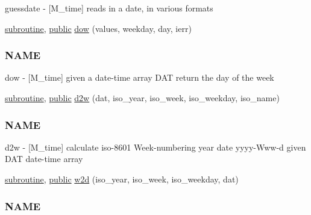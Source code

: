 \begin{DoxyCompactItemize}
\begin{DoxyCompactList}
guessdate -\/ \mbox{[}M\+\_\+time\mbox{]} reads in a date, in various formats \end{DoxyCompactList}\item 
\hyperlink{M__stopwatch_83_8txt_acfbcff50169d691ff02d4a123ed70482}{subroutine}, \hyperlink{M__stopwatch_83_8txt_a2f74811300c361e53b430611a7d1769f}{public} \hyperlink{namespacem__time_adfda8a89820b8d0ad4581a14896e4ce5}{dow} (values, weekday, day, ierr)
\begin{DoxyCompactList}\small\item\em \subsubsection*{N\+A\+ME}

dow -\/ \mbox{[}M\+\_\+time\mbox{]} given a date-\/time array D\+AT return the day of the week \end{DoxyCompactList}\item 
\hyperlink{M__stopwatch_83_8txt_acfbcff50169d691ff02d4a123ed70482}{subroutine}, \hyperlink{M__stopwatch_83_8txt_a2f74811300c361e53b430611a7d1769f}{public} \hyperlink{namespacem__time_ad4ff99ad6f6d5282c4b65ad636a2a627}{d2w} (dat, iso\+\_\+year, iso\+\_\+week, iso\+\_\+weekday, iso\+\_\+name)
\begin{DoxyCompactList}\small\item\em \subsubsection*{N\+A\+ME}

d2w -\/ \mbox{[}M\+\_\+time\mbox{]} calculate iso-\/8601 Week-\/numbering year date yyyy-\/\+Www-\/d given D\+AT date-\/time array \end{DoxyCompactList}\item 
\hyperlink{M__stopwatch_83_8txt_acfbcff50169d691ff02d4a123ed70482}{subroutine}, \hyperlink{M__stopwatch_83_8txt_a2f74811300c361e53b430611a7d1769f}{public} \hyperlink{namespacem__time_ac0ec48db8d508bfa23fe4b20c9d1c5a3}{w2d} (iso\+\_\+year, iso\+\_\+week, iso\+\_\+weekday, dat)
\begin{DoxyCompactList}\small\item\em \subsubsection*{N\+A\+ME}


\end{DoxyCompactList}
\end{DoxyCompactItemize}
